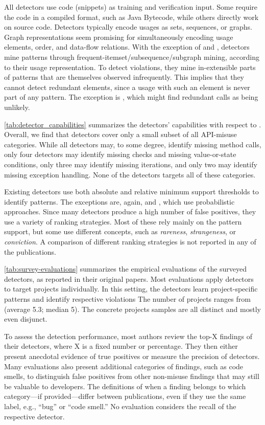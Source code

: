 \vspace{0.04in}
All detectors use code (snippets) as training and verification input.
Some require the code in a compiled format, such as Java Bytecode, while others directly work on source code.
Detectors typically encode usages as sets, sequences, or graphs.
Graph representations seem promising for simultaneously encoding usage elements, order, and data-flow relations.
With the exception of \DroidAssist and \DMMC, detectors mine patterns through frequent-itemset/subsequence/subgraph mining, according to their usage representation. 
To detect violations, they mine in-extensible parts of patterns that are themselves observed infrequently.
This implies that they cannot detect redundant elements, since a usage with such an element is never part of any pattern.
The exception is \DroidAssist, which might find redundant calls as being unlikely.

\autoref{tab:detector_capabilities} summarizes the detectors' capabilities with respect to \MUC.
Overall, we find that detectors cover only a small subset of all API-misuse categories.
While all detectors may, to some degree, identify missing method calls, only four detectors may identify missing  checks and missing value-or-state conditions, only three may identify missing iterations, and only two may identify missing exception handling.
None of the detectors targets all of these categories.

Existing detectors use both absolute and relative minimum support thresholds to identify patterns.
The exceptions are, again, \DroidAssist and \DMMC, which use probabilistic approaches.
Since many detectors produce a high number of false positives, they use a variety of ranking strategies.
Most of these rely mainly on the pattern support, but some use different concepts, such as \emph{rareness}, \emph{strangeness}, or \emph{conviction}.
A comparison of different ranking strategies is not reported in any of the publications.

\autoref{tab:survey-evaluations} summarizes the empirical evaluations of the surveyed detectors, as reported in their original papers.
Most evaluations apply detectors to target projects individually.
In this setting, the detectors learn project-specific patterns and identify respective violations
The number of projects ranges from  (average 5.3; median 5).
The concrete projects samples are all distinct and mostly even disjunct.

To assess the detection performance, most authors review the top-X findings of their detectors, where X is a fixed number or percentage.
They then either present anecdotal evidence of true positives or measure the precision of detectors.
Many evaluations also present additional categories of findings, such as code smells, to distinguish false positives from other non-misuse findings that may still be valuable to developers.
The definitions of when a finding belongs to which category---if provided---differ between publications, even if they use the same label, e.g., ``bug'' or ``code smell.''
No evaluation considers the recall of the respective detector.

